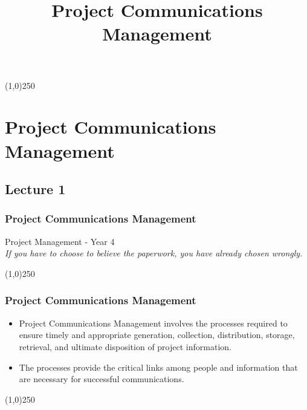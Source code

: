 




\title[Project Management]{Project Communications Management}




%
\usetikzlibrary{arrows}

\tableofcontents
\newpage



\begin{frame}
\titlepage
\end{frame}\begin{center}\line(1,0){250}\end{center}
%
%


\section{Project Communications Management}

\subsection{Lecture 1}





\begin{frame}
\frametitle{Project Communications Management}
Project Management - Year 4\\
\textit{If you have to choose to believe the paperwork, you have already chosen wrongly.}\\
\end{frame}\begin{center}\line(1,0){250}\end{center}


\begin{frame}
\frametitle{Project Communications Management}
\begin{itemize}
	\item Project Communications Management involves the processes required to ensure timely and appropriate generation, collection, distribution, storage, retrieval, and ultimate disposition of project information.
	\item The processes provide the critical links among people and information that are necessary for successful communications.
\end{itemize}
\end{frame}\begin{center}\line(1,0){250}\end{center}


